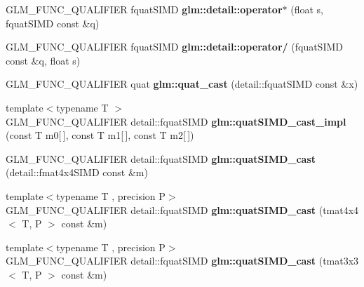 \begin{DoxyCompactItemize}
\item 
\mbox{\label{simd__quat_8inl_a586bbba0bf2940cecf9565510005679a}} 
G\+L\+M\+\_\+\+F\+U\+N\+C\+\_\+\+Q\+U\+A\+L\+I\+F\+I\+ER fquat\+S\+I\+MD {\bfseries glm\+::detail\+::operator$\ast$} (float s, fquat\+S\+I\+MD const \&q)
\item 
\mbox{\label{simd__quat_8inl_a242a463e8c91e55fd54ad6a68016e839}} 
G\+L\+M\+\_\+\+F\+U\+N\+C\+\_\+\+Q\+U\+A\+L\+I\+F\+I\+ER fquat\+S\+I\+MD {\bfseries glm\+::detail\+::operator/} (fquat\+S\+I\+MD const \&q, float s)
\item 
\mbox{\label{simd__quat_8inl_a68af15a87ea3aac558767c9bb2ed141d}} 
G\+L\+M\+\_\+\+F\+U\+N\+C\+\_\+\+Q\+U\+A\+L\+I\+F\+I\+ER quat {\bfseries glm\+::quat\+\_\+cast} (detail\+::fquat\+S\+I\+MD const \&x)
\item 
\mbox{\label{simd__quat_8inl_a2e2bb4244525831b56079cdacc87948d}} 
{\footnotesize template$<$typename T $>$ }\\G\+L\+M\+\_\+\+F\+U\+N\+C\+\_\+\+Q\+U\+A\+L\+I\+F\+I\+ER detail\+::fquat\+S\+I\+MD {\bfseries glm\+::quat\+S\+I\+M\+D\+\_\+cast\+\_\+impl} (const T m0\mbox{[}$\,$\mbox{]}, const T m1\mbox{[}$\,$\mbox{]}, const T m2\mbox{[}$\,$\mbox{]})
\item 
\mbox{\label{simd__quat_8inl_a0c09f4c773ffd14c3d9246a50011cf0c}} 
G\+L\+M\+\_\+\+F\+U\+N\+C\+\_\+\+Q\+U\+A\+L\+I\+F\+I\+ER detail\+::fquat\+S\+I\+MD {\bfseries glm\+::quat\+S\+I\+M\+D\+\_\+cast} (detail\+::fmat4x4\+S\+I\+MD const \&m)
\item 
\mbox{\label{simd__quat_8inl_a69b23f5cf01145b981cfb276c15813bb}} 
{\footnotesize template$<$typename T , precision P$>$ }\\G\+L\+M\+\_\+\+F\+U\+N\+C\+\_\+\+Q\+U\+A\+L\+I\+F\+I\+ER detail\+::fquat\+S\+I\+MD {\bfseries glm\+::quat\+S\+I\+M\+D\+\_\+cast} (tmat4x4$<$ T, P $>$ const \&m)
\item 
\mbox{\label{simd__quat_8inl_a7c78cc8051cf7df0760b2ba061a9f48a}} 
{\footnotesize template$<$typename T , precision P$>$ }\\G\+L\+M\+\_\+\+F\+U\+N\+C\+\_\+\+Q\+U\+A\+L\+I\+F\+I\+ER detail\+::fquat\+S\+I\+MD {\bfseries glm\+::quat\+S\+I\+M\+D\+\_\+cast} (tmat3x3$<$ T, P $>$ const \&m)

\end{DoxyCompactItemize}
